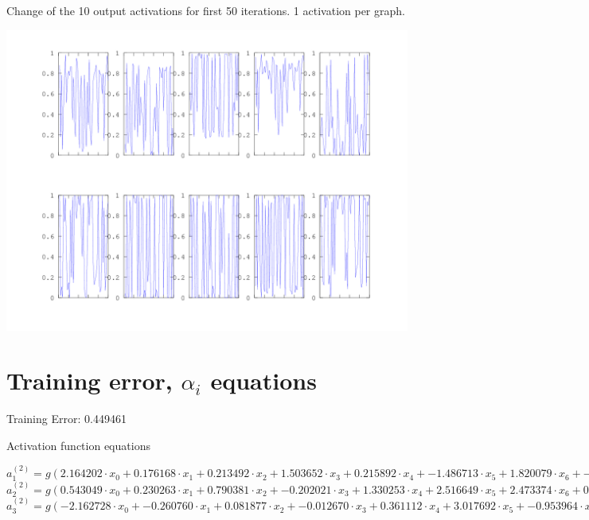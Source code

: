 \documentclass[10pt]{article}
\begin{document}
\begin{flushleft}
\newpage

Change of the 10 output activations for first 50 iterations. 1 activation per graph.

\includegraphics[width=\linewidth]{./outputchange.png}

\section{Training error, $\alpha_i$ equations}
Training Error: 0.449461

Activation function equations

\tiny
$a_{1}^{(2)} = g(2.164202 \cdot x_{0}+0.176168 \cdot x_{1}+0.213492 \cdot x_{2}+1.503652 \cdot x_{3}+0.215892 \cdot x_{4}+-1.486713 \cdot x_{5}+1.820079 \cdot x_{6}+-0.042223 \cdot x_{7}+0.035219 \cdot x_{8})$
$a_{2}^{(2)} = g(0.543049 \cdot x_{0}+0.230263 \cdot x_{1}+0.790381 \cdot x_{2}+-0.202021 \cdot x_{3}+1.330253 \cdot x_{4}+2.516649 \cdot x_{5}+2.473374 \cdot x_{6}+0.390521 \cdot x_{7}+-2.431607 \cdot x_{8})$
$a_{3}^{(2)} = g(-2.162728 \cdot x_{0}+-0.260760 \cdot x_{1}+0.081877 \cdot x_{2}+-0.012670 \cdot x_{3}+0.361112 \cdot x_{4}+3.017692 \cdot x_{5}+-0.953964 \cdot x_{6}+0.203506 \cdot x_{7}+-0.100807 \cdot x_{8})$


\end{flushleft}
\end{document}
